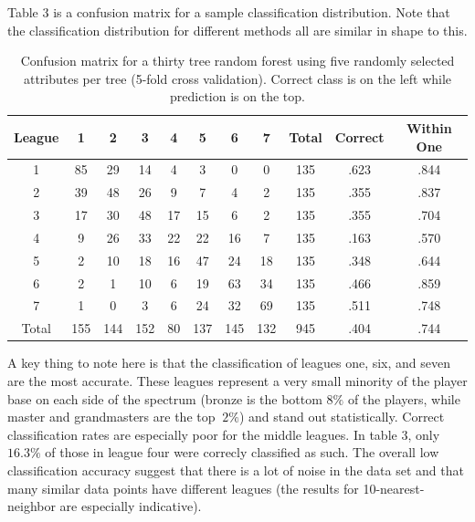 \documentclass{article} %
\begin{document}
Table 3 is a confusion matrix for a sample classification distribution. Note that the classification distribution for different methods all are similar in shape to this.
\setlength{\abovecaptionskip}{+13pt}
\begin{table}[H]
\renewcommand{\arraystretch}{1.3}
\caption {Confusion matrix for a thirty tree random forest using five randomly selected attributes per tree (5-fold cross validation). Correct class is on the left while prediction is on the top.  } 
\vspace{2 mm}
    \begin{tabular}{@{}| c | c  c  c  c  c  c  c | c  c  c  | @{}}
   \hline
    League   &1   & 2   & 3  & 4   & 5   & 6   & 7   & Total & Correct & Within One \\ \hline
    1     &  \cellcolor{green}85  &  \cellcolor{green!25}29  & 14 & 4   & 3   & 0   & 0   & 135 & .623 &  .844 \\ 
    2     & \cellcolor{green!25} 39  &  \cellcolor{green}48  &  \cellcolor{green!25}26 & 9  & 7   & 4   & 2   & 135 & .355 & .837  \\ 
    3     & 17  &  \cellcolor{green!25}30  &  \cellcolor{green}48 &  \cellcolor{green!25}17  & 15  & 6   & 2   & 135  & .355 & .704 \\
    4     & 9  & 26  &  \cellcolor{green!25}33 &  \cellcolor{green}22  &  \cellcolor{green!25}22  & 16  & 7  & 135 & .163 & .570  \\
    5     & 2   & 10  &18 &  \cellcolor{green!25}16  &  \cellcolor{green}47  &  \cellcolor{green!25}24  & 18  & 135 & .348 & .644  \\
    6     & 2   & 1   & 10  & 6   &  \cellcolor{green!25}19  &  \cellcolor{green}63  &  \cellcolor{green!25}34  & 135  & .466 & .859 \\
    7     & 1   & 0   & 3  & 6   &24  & \cellcolor{green!25} 32  &  \cellcolor{green}69  & 135  & .511 & .748  \\\hline
    Total & 155 & 144 & 152 & 80 & 137 & 145 & 132 & 945 & \cellcolor{green}.404 &\cellcolor{green!25} .744 \\
   \hline
    \end{tabular}
\end{table}

A key thing to note here is that the classification of leagues one, six, and seven are the most accurate. These leagues represent a very small minority of the player base on each side of the spectrum (bronze is the bottom \(8\%\) of the players, while master and grandmasters are the top \(~2\%\)) and stand out statistically. Correct classification rates are especially poor for the middle leagues. In table 3, only \(16.3\%\) of those in league four were correcly classified as such. The overall low classification accuracy suggest that there is a lot of noise in the data set and that many similar data points have different leagues (the results for 10-nearest-neighbor are especially indicative). 
\end{document}
